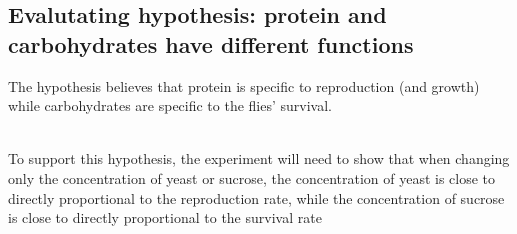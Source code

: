 \documentclass{article}
\begin{document}

\subsection{Evalutating hypothesis: protein and carbohydrates have different functions}

The hypothesis believes that protein is specific to reproduction (and growth) while carbohydrates are specific to the flies' survival.

\noindent\\
To support this hypothesis, the experiment will need to show that when changing only the concentration of yeast or sucrose, the concentration of yeast is close to directly proportional to the reproduction rate, while the concentration of sucrose is close to directly proportional to the survival rate
\end{document}
